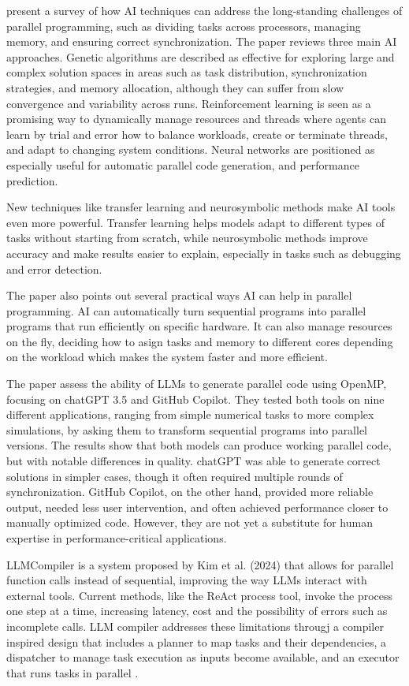 \documentclass[conference]{IEEEtran}
\begin{document}
\cite{advancing_parallel} present a survey of how AI techniques can address the long-standing challenges of parallel programming, such as dividing tasks across processors, managing memory, and ensuring correct synchronization. The paper reviews three main AI approaches. Genetic algorithms are described as effective for exploring large and complex solution spaces in areas such as task distribution, synchronization strategies, and memory allocation, although they can suffer from slow convergence and variability across runs. Reinforcement learning is seen as a promising way to dynamically manage resources and threads where agents can learn by trial and error how to balance workloads, create or terminate threads, and adapt to changing system conditions. Neural networks are positioned as especially useful for automatic parallel code generation, and performance prediction. 

New techniques like transfer learning and neurosymbolic methods make AI tools even more powerful. Transfer learning helps models adapt to different types of tasks without starting from scratch, while neurosymbolic methods improve accuracy and make results easier to explain, especially in tasks such as debugging and error detection. 

The paper also points out several practical ways AI can help in parallel programming. AI can automatically turn sequential programs into parallel programs that run efficiently on specific hardware. It can also manage resources on the fly, deciding how to asign tasks and memory to different cores depending on the workload which makes the system faster and more efficient. 

The paper \cite{LLMsforOpenMP} assess the ability of LLMs to generate parallel code using OpenMP, focusing on chatGPT 3.5 and GitHub Copilot. They tested both tools on nine different applications, ranging from simple numerical tasks to more complex simulations, by asking them to transform sequential programs into parallel versions. The results show that both models can produce working parallel code, but with notable differences in quality. chatGPT was able to generate correct solutions in simpler cases, though it often required multiple rounds of synchronization. GitHub Copilot, on the other hand, provided more reliable output, needed less user intervention, and often achieved performance closer to manually optimized code. However, they are not yet a substitute for human expertise in performance-critical applications.

LLMCompiler is a system proposed by Kim et al. (2024)  that allows for parallel function calls instead of sequential, improving the way LLMs interact with external tools. Current methods, like the ReAct process tool, invoke the process one step at a time, increasing latency, cost and the possibility of errors such as incomplete calls. LLM compiler addresses these limitations througj a compiler inspired design that includes a planner to map tasks and their dependencies, a dispatcher to manage task execution as inputs become available, and an executor that runs tasks in parallel \cite{kim2024llmcompilerparallelfunction}.
\end{document}
